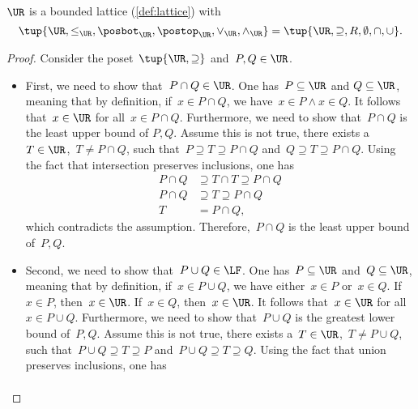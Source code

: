 
\begin{lemma}
  \label{lem:u_bounded_lat}
  $\UR$ is a bounded lattice (\cref{def:lattice}) with
  \begin{equation}
    \tup{\UR,\leq_{\UR},\posbot_{\UR},\postop_{\UR},\vee_{\UR},\wedge_{\UR}}=\tup{\UR,\supseteq,R,\emptyset,\cap,\cup}.
  \end{equation}
\end{lemma}
\begin{proof}
  Consider the poset~$\tup{\UR,\supseteq}$ and~$P,Q\in \UR$.
  \begin{itemize}
    \item First, we need to show that~$P\cap Q\in \UR$. One has~$P \subseteq \UR$ and $Q\subseteq \UR$, meaning that by definition, if~$x\in P\cap Q$, we have~$x\in P \wedge x\in Q$. It follows that~$x\in \UR$ for all~$x\in P\cap Q$. Furthermore, we need to show that~$P\cap Q$ is the least upper bound of $P,Q$. Assume this is not true, \ie  there exists a~$T\in \UR$,~$T\neq P\cap Q$, such that~$P\supseteq T\supseteq P\cap Q$ and~$Q\supseteq T\supseteq P\cap Q$. Using the fact that intersection preserves inclusions, one has
    \begin{equation}
      \begin{aligned}
        P\cap Q &\supseteq T\cap T \supseteq P\cap Q\\
        P\cap Q &\supseteq T \supseteq P\cap Q\\
        T&= P\cap Q,
      \end{aligned}
    \end{equation}
    which contradicts the assumption. Therefore,~$P\cap Q$ is the least upper bound of~$P,Q$.
    \item Second, we need to show that~$P\cup Q\in \LF$. One has~$P\subseteq \UR$ and~$Q\subseteq \UR$, meaning that by definition, if~$x\in P\cup Q$, we have either~$x\in P$ or~$x\in Q$. If~$x\in P$, then~$x\in \UR$. If~$x\in Q$, then~$x\in \UR$. It follows that~$x\in \UR$ for all~$x\in P\cup Q$. Furthermore, we need to show that~$P\cup Q$ is the greatest lower bound of~$P,Q$. Assume this is not true, \ie  there exists a~$T\in \UR$,~$T\neq P\cup Q$, such that~$P\cup Q\supseteq T\supseteq P$ and~$P\cup Q\supseteq T\supseteq Q$. Using the fact that union preserves inclusions, one has
    \begin{equation}
      \begin{aligned}

\end{aligned}
\end{equation}
\end{itemize}
\end{proof}

